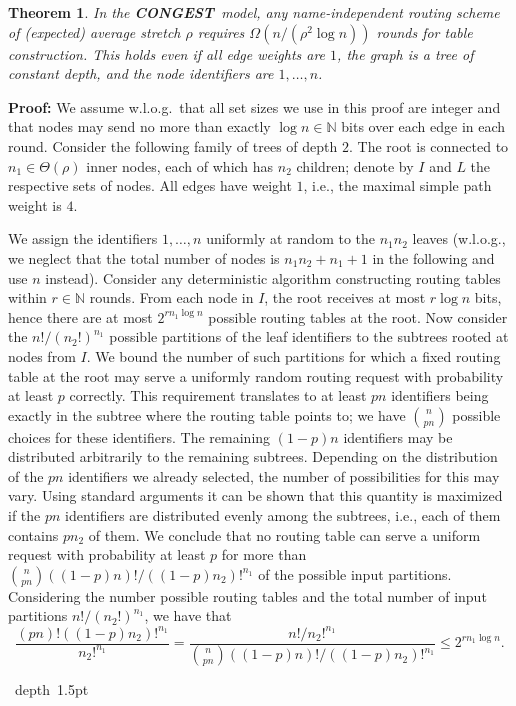 \documentclass[letterpaper,11pt]{article}
\newtheorem{theorem}{Theorem}[section]
\newcommand{\blackslug}{\hbox{\hskip 1pt \vrule width 4pt height 8pt
depth 1.5pt \hskip 1pt}}
\newcommand{\QED}{\quad\blackslug\lower 8.5pt\null\par}
\newenvironment{proof}[1][Proof:]{\noindent \textbf{#1}\xspace}{\QED}
\newcommand{\N}{\mathbb{N}}
\newcommand{\CONGEST}{\textbf{CONGEST}}
\begin{document}
\begin{theorem}\label{thm:lower_route_independent}
In the \CONGEST\ model, any name-independent routing scheme of (expected)
average stretch $\rho$ requires $\Omega(n/(\rho^2\log n))$ rounds for table
construction. This holds even if all edge weights are $1$, the graph is a tree
of constant depth, and the node identifiers are $1,\ldots,n$.
\end{theorem}
\begin{proof}
We assume w.l.o.g.\ that all set sizes we use in this proof are integer and that
nodes may send no more than exactly $\log n \in \N$ bits over each edge in each
round. Consider the following family of trees of depth $2$. The root is
connected to $n_1\in \Theta(\rho)$ inner nodes, each of which has $n_2$
children; denote by $I$ and $L$ the respective sets of nodes. All edges have
weight $1$, i.e., the maximal simple path weight is $4$.

We assign the identifiers $1,\ldots,n$ uniformly at random to the $n_1n_2$
leaves (w.l.o.g., we neglect that the total number of nodes is $n_1n_2+n_1+1$ in
the following and use $n$ instead). Consider any deterministic algorithm
constructing routing tables within $r\in \N$ rounds. From each node in $I$, the
root receives at most $r\log n$ bits, hence there are at most $2^{rn_1\log
n}$ possible routing tables at the root. Now consider the $n!/(n_2!)^{n_1}$
possible partitions of the leaf identifiers to the subtrees rooted at nodes from
$I$. We bound the number of such partitions for which a fixed routing table at
the root may serve a uniformly random routing request with probability at least $p$
correctly. This requirement translates to at least $pn$ identifiers being
exactly in the subtree where the routing table points to; we have
$\binom{n}{pn}$ possible choices for these identifiers. The remaining $(1-p)n$
identifiers may be distributed arbitrarily to the remaining subtrees. Depending
on the distribution of the $pn$ identifiers we already selected, the number of
possibilities for this may vary. Using standard arguments it can be shown that this quantity is maximized if the $pn$ identifiers are
distributed evenly among the subtrees, i.e., each of them contains $pn_2$ of
them. We conclude that no routing table can serve a uniform request with
probability at least $p$ for more than
$\binom{n}{pn}((1-p)n)!/((1-p)n_2)!^{n_1}$ of the possible input partitions.
Considering the number possible routing tables and the total number of input
partitions $n!/(n_2!)^{n_1}$, we have that
\begin{equation*}
\frac{(pn)!((1-p)n_2)!^{n_1}}{n_2!^{n_1}}=
\frac{n!/n_2!^{n_1}}{\binom{n}{pn}((1-p)n)!/((1-p)n_2)!^{n_1}}\leq
 2^{rn_1\log n}.
\end{equation*}


\end{proof}
\end{document}
